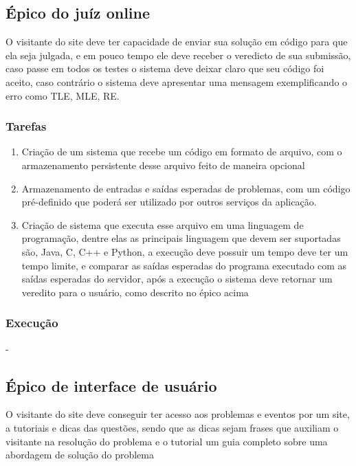 \subsection{Épico do juíz online}

O visitante do site deve ter capacidade de enviar sua solução em código para que ela seja julgada, e em pouco tempo ele deve receber o veredicto de sua submissão, caso passe em todos os testes o sistema deve deixar claro que seu código foi aceito, caso contrário o sistema deve apresentar uma mensagem exemplificando o erro como TLE, MLE, RE.

\subsubsection{Tarefas}
\begin{enumerate}
    \item Criação de um sistema que recebe um código em formato de arquivo, com o armazenamento persistente desse arquivo feito de maneira opcional
    \item Armazenamento de entradas e saídas esperadas de problemas, com um código pré-definido que poderá ser utilizado por outros serviços da aplicação.
    \item Criação de sistema que executa esse arquivo em uma linguagem de programação, dentre elas as principais linguagem que devem ser suportadas são, Java, C, C++ e Python, a execução deve possuir um tempo deve ter um tempo limite, e comparar as saídas esperadas do programa executado com as saídas esperadas do servidor, após a execução o sistema deve retornar um veredito para o usuário, como descrito no épico acima
\end{enumerate}

\subsubsection{Execução}

-


\subsection{Épico de interface de usuário}

O visitante do site deve conseguir ter acesso aos problemas e eventos por um site, a tutoriais e dicas das questões, sendo que as dicas sejam frases que auxiliam o visitante na resolução do problema e o tutorial um guia completo sobre uma abordagem de solução do problema

